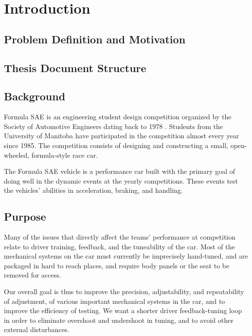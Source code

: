 %
%
%
%

\chapter{Introduction}

\section{Problem Definition and Motivation}

\section{Thesis Document Structure}

\section{Background}

Formula SAE is an engineering student design competition organized by the Society of Automotive Engineers dating back to 1978 \cite{fsaehistory}. Students from the University of Manitoba have participated in the competition almost every year since 1985. The competition consists of designing and constructing a small, open-wheeled, formula-style race car.

The Formula SAE vehicle is a performance car built with the primary goal of doing well in the dynamic events at the yearly competitions. These events test the vehicles' abilities in acceleration, braking, and handling.

\section{Purpose}

Many of the issues that directly affect the teams' performance at competition relate to driver training, feedback, and the tuneability of the car. Most of the mechanical systems on the car must currently be imprecisely hand-tuned, and are packaged in hard to reach places, and require body panels or the seat to be removed for access.

Our overall goal is thus to improve the precision, adjustability, and repeatability of adjustment, of various important mechanical systems in the car, and to improve the efficiency of testing. We want a shorter driver feedback-tuning loop in order to eliminate overshoot and undershoot in tuning, and to avoid other external disturbances.

